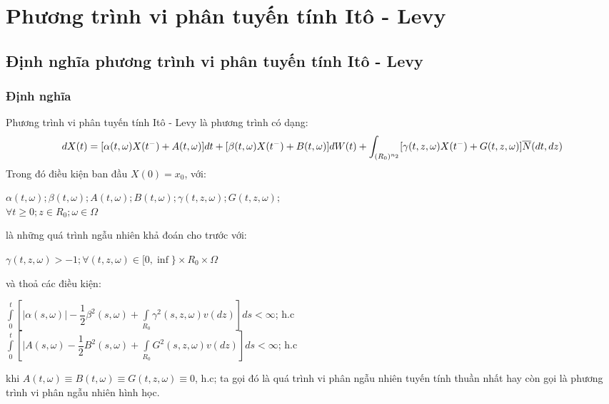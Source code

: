\documentclass[a4paper]{article}
\numberwithin{equation}{section}
\begin{document}
\section{Phương trình vi phân tuyến tính Itô - Levy}
\subsection{Định nghĩa phương trình vi phân tuyến tính Itô - Levy}
\subsubsection{Định nghĩa}
Phương trình vi phân tuyến tính Itô - Levy là phương trình có dạng:
\begin{dmath}\label{eq:dn1}
	dX(t)=[\alpha(t,\omega)X(t^-)+A(t,\omega)]dt+[\beta(t,\omega)X(t^-)+B(t,\omega)]dW(t)\\
	+\int_{(R_0)^{n_2}}[\gamma(t,z,\omega)X(t^-)+G(t,z,\omega)]\overline{N}(dt,dz)
\end{dmath}
Trong đó điều kiện ban đầu $X(0)=x_0$, với:
\begin{center}
$\alpha(t,\omega); \beta(t,\omega);A(t,\omega);B(t,\omega);\gamma(t,z,\omega);G(t,z,\omega);$\\
$\forall t \geqslant 0; z \in R_0; \omega \in \Omega$
\end{center}
là những quá trình ngẫu nhiên khả đoán cho trước với:
\begin{center}
	$\gamma(t,z,\omega)>-1;\forall (t,z,\omega)\in [0,\inf\}\times R_0 \times \Omega$
\end{center}
và thoả các điều kiện:
\begin{center}
	$\int\limits_{0}^t[|\alpha(s,\omega)|-\dfrac{1}{2}\beta^2(s,\omega)+\int\limits_{R_0} \gamma^2(s,z,\omega)v(dz)]ds<\infty$; h.c\\
	$\int\limits_{0}^t [|A(s,\omega)-\dfrac{1}{2}B^2(s,\omega)+\int\limits_{R_0}G^2(s,z,\omega)v(dz)]ds<\infty$; h.c
\end{center}
khi $A(t,\omega)\equiv B(t,\omega)\equiv G(t,z,\omega)\equiv 0$, h.c; ta gọi đó là quá trình vi phân ngẫu nhiên tuyến tính thuần nhất hay còn gọi là phương trình vi phân ngẫu nhiên hình học.\\
\end{document}
